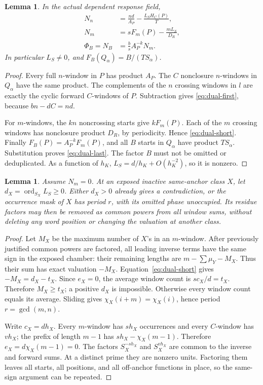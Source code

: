 \documentclass[11pt,a4paper]{amsart}
\numberwithin{equation}{section}
\theoremstyle{plain}
\newtheorem{lemma}[theorem]{Lemma}
\theoremstyle{definition}
\begin{document}
\begin{lemma}\label{lem:dual-identities}
In the actual dependent response field,
\begin{align}
 N_n&=\frac{nd}{A_P}-\frac{L_SH_C(P)}{T},\label{eq:dual-first}\\
 N_m&=sF_m(P)-\frac{mL_S}{D_R},\label{eq:dual-short}\\
 \Phi_B=N_B&=\frac bs A_P^{-k}N_m.\label{eq:dual-last}
\end{align}
In particular \(L_S\ne0\), and \(F_B(Q_\alpha)=B/(TS_\alpha)\).
\end{lemma}
\begin{proof}
Every full \(n\)-window in \(P\) has product \(A_P\).  The \(C\) nonclosure \(n\)-windows in \(Q_\alpha\) have the same product.  The complements of the \(n\) crossing windows in \(l\) are exactly the cyclic forward \(C\)-windows of \(P\).  Subtraction gives \eqref{eq:dual-first}, because \(bn-dC=nd\).

For \(m\)-windows, the \(kn\) noncrossing starts give \(kF_m(P)\).  Each of the \(m\) crossing windows has nonclosure product \(D_R\), by periodicity.  Hence \eqref{eq:dual-short}.  Finally \(F_B(P)=A_P^{-k}F_m(P)\), and all \(B\) starts in \(Q_\alpha\) have product \(TS_\alpha\).  Substitution proves \eqref{eq:dual-last}.  The factor \(B\) must not be omitted or deduplicated.  As a function of \(h_K\), \(L_S=d/h_K+O(h_K^{-2})\), so it is nonzero.
\end{proof}

\begin{lemma}\label{lem:peeling}
Assume \(N_m=0\).  At an exposed inactive same-anchor class \(X\), let \(d_X=\operatorname{ord}_{S_X}L_S\ge0\).  Either \(d_X>0\) already gives a contradiction, or the occurrence mask of \(X\) has period \(r\), with its omitted phase unoccupied.  Its residue factors may then be removed as common powers from all window sums, without deleting any word position or changing the valuation at another class.
\end{lemma}
\begin{proof}
Let \(M_X\) be the maximum number of \(X\)'s in an \(m\)-window.  After previously justified common powers are factored, all leading inverse terms have the same sign in the exposed chamber: their remaining lengths are \(m-\sum\mu_Y-M_X\).  Thus their sum has exact valuation \(-M_X\).  Equation~\eqref{eq:dual-short} gives \(-M_X=d_X-t_X\).  Since \(e_X=0\), the average window count is \(sc_X/d=t_X\).  Therefore \(M_X\ge t_X\); a positive \(d_X\) is impossible.  Otherwise every window count equals its average.  Sliding gives \(\chi_X(i+m)=\chi_X(i)\), hence period \(r=\gcd(m,n)\).

Write \(c_X=dh_X\).  Every \(m\)-window has \(sh_X\) occurrences and every \(C\)-window has \(vh_X\); the prefix of length \(m-1\) has \(sh_X-\chi_X(m-1)\).  Therefore \(e_X=d\chi_X(m-1)=0\).  The factors \(S_X^{-sh_X}\) and \(S_X^{vh_X}\) are common to the inverse and forward sums.  At a distinct prime they are nonzero units.  Factoring them leaves all starts, all positions, and all off-anchor functions in place, so the same-sign argument can be repeated.
\end{proof}
\end{document}

